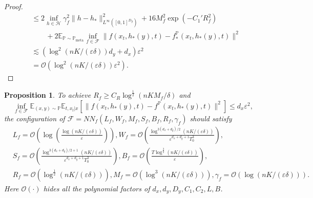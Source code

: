 \documentclass{article}
\numberwithin{equation}{section}
\newcommand{\E}{\mathbb{E}}
\newtheorem{prop}[thm]{Proposition}
\theoremstyle{definition}
\newcommand{\Pmeta}{\mathbb{P}_{\text{meta}}}
\renewcommand{\P}{\mathbb{P}}
\begin{document}
\begin{proof}
\begin{equation}
\begin{aligned}
            &\leq 2\inf_{h\in\mathcal{H}}\gamma_f^2\|h-h_*\|_{L^\infty([0,1]^{D_y})}^2 + 16M_f^2\exp(-C_1'R_f^2) \\
            &\qquad +2\E_{\P\sim\Pmeta}\inf_{f\in\mathcal{F}}\|f(x_t,h_*(y),t)-f_*^\P(x_t,h_*(y),t)\|^2 \\
            &\lesssim \left(\log^2(nK/(\varepsilon\delta))d_y+ d_x\right)\varepsilon^2 \\
            &= \mathcal{O}\left(\log^2(nK/(\varepsilon\delta))\varepsilon^2\right).
        \end{aligned}
    \end{equation}
\end{proof}

\begin{prop}\label{prop:approximation_f}
    To achieve $R_f\geq C_R\log^{\frac{1}{2}}(nKM_f/\delta)$ and
    \begin{equation}
        \inf_{f\in\mathcal{F}}\E_{(x,y)\sim\P}\E_{t,x_t|x} [\|f(x_t,h_*(y),t)-f^\P(x_t,h_*(y),t)\|^2] \leq d_x\varepsilon^2,
    \end{equation}
    the configuration of $\mathcal{F}=NN_f(L_f,W_f,M_f,S_f,B_f,R_f,\gamma_f)$ should satisfy
    \begin{equation}
        \begin{aligned}
            &L_f=\mathcal{O}\left(\log\left(\frac{\log(nK/(\varepsilon\delta))}{\varepsilon}\right)\right),
            W_f=\mathcal{O}\left(\frac{\log^{3(d_x+d_y)/2}(nK/(\varepsilon\delta))}{\varepsilon^{d_x+d_y+1}T_0^3}\right), \\
            &S_f=\mathcal{O}\left(\frac{\log^{3(d_x+d_y)/2+1}(nK/(\varepsilon\delta))}{\varepsilon^{d_x+d_y+1}T_0^3}\right),
            B_f=\mathcal{O}\left(\frac{T\log^{\frac{3}{2}}(nK/(\varepsilon\delta))}{\varepsilon}\right), \\
            &R_f=\mathcal{O}\left(\log^{\frac{1}{2}}(nK/(\varepsilon\delta))\right), 
            M_f=\mathcal{O}\left(\log^3(nK/(\varepsilon\delta))\right),
            \gamma_f=\mathcal{O}\left(\log(nK/(\varepsilon\delta))\right).
        \end{aligned}
    \end{equation}
    Here $\mathcal{O}(\cdot)$ hides all the polynomial factors of $d_x,d_y,D_y,C_1,C_2,L,B$.
\end{prop}
\end{document}
